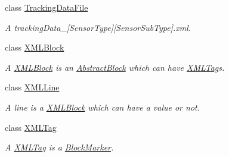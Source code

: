 \begin{DoxyCompactItemize}
class \hyperlink{class_a_rdev_kit_1_1_model_1_1_project_1_1_file_1_1_tracking_data_file}{Tracking\-Data\-File}
\begin{DoxyCompactList}\small\item\em A tracking\-Data\-\_\-\mbox{[}Sensor\-Type\mbox{]}\mbox{[}Sensor\-Sub\-Type\mbox{]}.xml. \end{DoxyCompactList}\item 
class \hyperlink{class_a_rdev_kit_1_1_model_1_1_project_1_1_file_1_1_x_m_l_block}{X\-M\-L\-Block}
\begin{DoxyCompactList}\small\item\em A \hyperlink{class_a_rdev_kit_1_1_model_1_1_project_1_1_file_1_1_x_m_l_block}{X\-M\-L\-Block} is an \hyperlink{class_a_rdev_kit_1_1_model_1_1_project_1_1_file_1_1_abstract_block}{Abstract\-Block} which can have \hyperlink{class_a_rdev_kit_1_1_model_1_1_project_1_1_file_1_1_x_m_l_tag}{X\-M\-L\-Tag}s. \end{DoxyCompactList}\item 
class \hyperlink{class_a_rdev_kit_1_1_model_1_1_project_1_1_file_1_1_x_m_l_line}{X\-M\-L\-Line}
\begin{DoxyCompactList}\small\item\em A line is a \hyperlink{class_a_rdev_kit_1_1_model_1_1_project_1_1_file_1_1_x_m_l_block}{X\-M\-L\-Block} which can have a value or not. \end{DoxyCompactList}\item 
class \hyperlink{class_a_rdev_kit_1_1_model_1_1_project_1_1_file_1_1_x_m_l_tag}{X\-M\-L\-Tag}
\begin{DoxyCompactList}\small\item\em A \hyperlink{class_a_rdev_kit_1_1_model_1_1_project_1_1_file_1_1_x_m_l_tag}{X\-M\-L\-Tag} is a \hyperlink{class_a_rdev_kit_1_1_model_1_1_project_1_1_file_1_1_block_marker}{Block\-Marker}. \end{DoxyCompactList}\end{DoxyCompactItemize}
